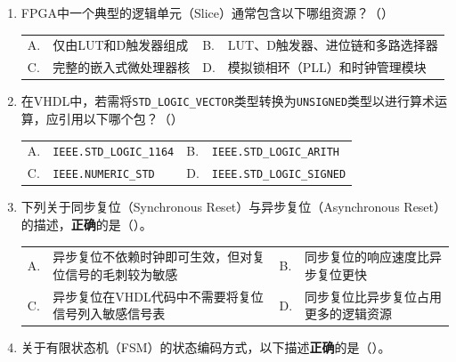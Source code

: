 \begin{enumerate}[label=\arabic*.]

\item FPGA中一个典型的逻辑单元（Slice）通常包含以下哪组资源？（\quad）

\vspace{0.3cm}

\begin{tabular}{@{}lp{}@{\qquad}lp{}@{}}
A. & 仅由LUT和D触发器组成 &
B. & LUT、D触发器、进位链和多路选择器 \\
C. & 完整的嵌入式微处理器核 &
D. & 模拟锁相环（PLL）和时钟管理模块 \\
\end{tabular}

\vspace{0.8cm}

\item 在VHDL中，若需将\texttt{STD\_LOGIC\_VECTOR}类型转换为\texttt{UNSIGNED}类型以进行算术运算，应引用以下哪个包？（\quad）

\vspace{0.3cm}

\begin{tabular}{@{}lp{}@{\qquad}lp{}@{}}
A. & \texttt{IEEE.STD\_LOGIC\_1164} &
B. & \texttt{IEEE.STD\_LOGIC\_ARITH} \\
C. & \texttt{IEEE.NUMERIC\_STD} &
D. & \texttt{IEEE.STD\_LOGIC\_SIGNED} \\
\end{tabular}

\vspace{0.8cm}

\item 下列关于同步复位（Synchronous Reset）与异步复位（Asynchronous Reset）的描述，\textbf{正确}的是（\quad）。

\vspace{0.3cm}

\begin{tabular}{@{}lp{}@{\qquad}lp{}@{}}
A. & 异步复位不依赖时钟即可生效，但对复位信号的毛刺较为敏感 &
B. & 同步复位的响应速度比异步复位更快 \\
C. & 异步复位在VHDL代码中不需要将复位信号列入敏感信号表 &
D. & 同步复位比异步复位占用更多的逻辑资源 \\
\end{tabular}

\vspace{0.8cm}

\item 关于有限状态机（FSM）的状态编码方式，以下描述\textbf{正确}的是（\quad）。


\end{enumerate}
